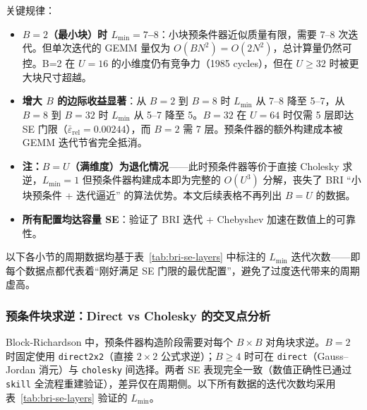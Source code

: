 \documentclass{CjC}
\begin{document}
    关键规律：
    \begin{itemize}
        \item \textbf{$B=2$（最小块）时 $L_{\min}=7$--$8$}：小块预条件器近似质量有限，需要
            7--8 次迭代。但单次迭代的 GEMM 量仅为 $O(B N^{2})=O(2 N^{2})$，总计算量仍然可控。B=2
            在 $U=16$ 的小维度仍有竞争力（1985 cycles），但在 $U\ge32$ 时被更大块尺寸超越。

        \item \textbf{增大 $B$ 的边际收益显著}：从 $B=2$ 到 $B=8$ 时 $L_{\min}$ 从
            7--8 降至 5--7，从 $B=8$ 到 $B=32$ 时 $L_{\min}$ 从 5--7 降至 5。$B=3
            2$ 在 $U=64$ 时仅需 5 层即达 SE 门限（$\bar{\varepsilon}_{\text{rel}}=0.00244$），而 $B=2$
            需 7 层。预条件器的额外构建成本被 GEMM 迭代节省完全抵消。

        \item \textbf{注：$B=U$（满维度）为退化情况}——此时预条件器等价于直接 Cholesky
            求逆，$L_{\min}=1$ 但预条件器构建成本即为完整的 $O(U^{3})$
            分解，丧失了 BRI ``小块预条件 + 迭代逼近''
            的算法优势。本文后续表格不再列出 $B=U$ 的数据。

        \item \textbf{所有配置均达容量 SE}：验证了 BRI 迭代 + Chebyshev 加速在数值上的可靠性。
    \end{itemize}

    以下各小节的周期数据均基于表~\ref{tab:bri-se-layers} 中标注的 $L_{\min}$ 迭代次数——即每个数据点都代表着“刚好满足
    SE 门限的最优配置”，避免了过度迭代带来的周期虚高。

    \subsubsection{预条件块求逆：Direct vs Cholesky 的交叉点分析}
    \label{sec:bri-precond}

    Block-Richardson 中，预条件器构造阶段需要对每个 $B\times B$ 对角块求逆。$B=2$
    时固定使用 \texttt{direct2x2}（直接 $2\times2$ 公式求逆）；$B\ge4$ 时可在 \texttt{direct}（Gauss--Jordan
    消元）与 \texttt{cholesky} 间选择。两者 SE 表现完全一致（数值正确性已通过 \texttt{skill}
    全流程重建验证），差异仅在周期侧。以下所有数据的迭代次数均采用表~\ref{tab:bri-se-layers}
    验证的 $L_{\min}$。
\end{document}
